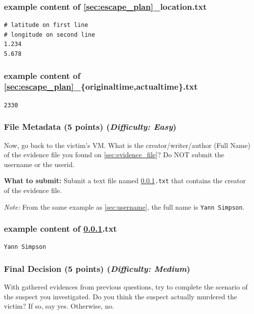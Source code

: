 \documentclass[letterpaper,12pt]{report}
\begin{document}
\newpage
\subsubsection*{example content of {\ref{sec:escape_plan}\_location.txt}}
\begin{mdframed}
\begin{Verbatim}
# latitude on first line
# longitude on second line
1.234
5.678
\end{Verbatim}
\end{mdframed}

\subsubsection*{example content of {\ref{sec:escape_plan}\_\{originaltime,actualtime\}.txt}}
\begin{mdframed}
\begin{Verbatim}
2330
\end{Verbatim}
\end{mdframed}

\subsubsection{File Metadata (5 points)    \hfill\rm\normalsize (\emph{Difficulty: Easy})}
\label{sec:file_metadata}
Now, go back to the victim's VM. What is the creator/writer/author (Full Name) of the evidence file you found on \ref{sec:evidence_file}? Do NOT submit the username or the userid. 

\medskip 
\textbf{What to submit:} Submit a text file named \texttt{\ref{sec:file_metadata}.txt} that contains the creator of the evidence file.

\medskip 
\textit{Note:} From the same example as \ref{sec:username}, the full name is \texttt{Yann Simpson}.

\subsubsection*{example content of {\ref{sec:file_metadata}.txt}}
\begin{mdframed}
\begin{Verbatim}
Yann Simpson
\end{Verbatim}
\end{mdframed}

\subsubsection{Final Decision (5 points)    \hfill\rm\normalsize (\emph{Difficulty: Medium})}
\label{sec:final_decision}
With gathered evidences from previous questions, try to complete the scenario of the suspect you investigated. Do you think the suspect actually murdered the victim? If so, say yes. Otherwise, no.
\end{document}
